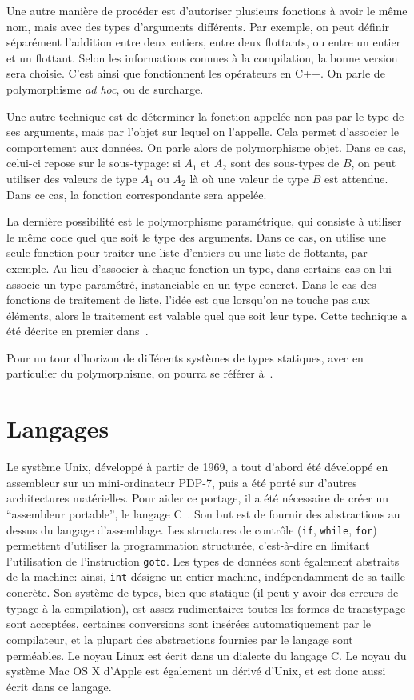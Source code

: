 Une autre manière de procéder est d'autoriser plusieurs fonctions à avoir le
même nom, mais avec des types d'arguments différents. Par exemple, on peut
définir séparément l'addition entre deux entiers, entre deux flottants, ou entre
un entier et un flottant. Selon les informations connues à la compilation, la
bonne version sera choisie. C'est ainsi que fonctionnent les opérateurs en C++.
On parle de polymorphisme \emph{ad hoc}, ou de surcharge.

Une autre technique est de déterminer la fonction appelée non pas par le type de
ses arguments, mais par l'objet sur lequel on l'appelle. Cela permet d'associer
le comportement aux données. On parle alors de polymorphisme objet. Dans ce cas,
celui-ci repose sur le sous-typage: si $A_1$ et $A_2$ sont des sous-types de
$B$, on peut utiliser des valeurs de type $A_1$ ou $A_2$ là où une valeur de
type $B$ est attendue. Dans ce cas, la fonction correspondante sera appelée.

La dernière possibilité est le polymorphisme paramétrique, qui consiste à
utiliser le \linebreak même code quel que soit le type des arguments. Dans ce
cas, on utilise une seule fonction pour traiter une liste d'entiers ou une liste
de flottants, par exemple. Au lieu d'associer à chaque fonction un type, dans
certains cas on lui associe un type paramétré, instanciable en un type concret.
Dans le cas des fonctions de traitement de liste, l'idée est que lorsqu'on ne
touche pas aux éléments, alors le traitement est valable quel que soit leur
type. Cette technique a été décrite en premier dans~\cite{Milner78}.

Pour un tour d'horizon de différents systèmes de types statiques, avec en
particulier du polymorphisme, on pourra se référer à~\cite{TAPL}.

\section{Langages}

Le système Unix, développé à partir de 1969, a tout d'abord été développé en
assembleur sur un mini-ordinateur PDP-7, puis a été porté sur d'autres
architectures matérielles. Pour aider ce portage, il a été nécessaire de créer
un \enquote{assembleur portable}, le langage C~\cite{KandR,AnsiC}. Son but est
de fournir des abstractions au dessus du langage d'assemblage. Les structures de
contrôle (\texttt{if}, \texttt{while}, \texttt{for}) permettent d'utiliser la
programmation structurée, c'est-à-dire en limitant l'utilisation de
l'instruction \texttt{goto}. Les types de données sont également abstraits de la
machine: ainsi, \texttt{int} désigne un entier machine, indépendamment de sa
taille concrète. Son système de types, bien que statique (il peut y avoir des
erreurs de typage à la compilation), est assez rudimentaire: toutes les formes
de transtypage sont acceptées, certaines conversions sont insérées
automatiquement par le compilateur, et la plupart des abstractions fournies par
le langage sont perméables. Le noyau Linux est écrit dans un dialecte du langage
C. Le noyau du système Mac OS X d'Apple est également un dérivé d'Unix, et est
donc aussi écrit dans ce langage.

